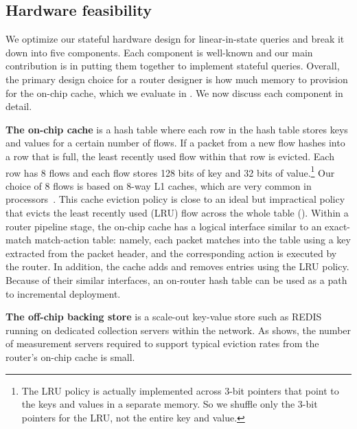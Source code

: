 
\subsection{Hardware feasibility}
\label{sec:hardware-feasibility}
We optimize our stateful hardware design for linear-in-state queries and break
it down into five components.  Each component is well-known and our main
contribution is in putting them together to implement stateful queries.
Overall, the primary design choice for a router designer is how much memory to
provision for the on-chip cache, which we evaluate in . We now
discuss each component in detail.

\textbf{The on-chip cache} is a hash table where each row in the hash table
stores keys and values for a certain number of flows. If a packet from a new
flow hashes into a row that is full, the least recently used flow within that row is
evicted. Each row has 8 flows and each flow stores 128 bits of key and 32 bits
of value.\footnote{The LRU policy is actually implemented across 3-bit pointers
that point to the keys and values in a separate memory. So we 
shuffle only the 3-bit pointers for the LRU, not the entire key and
value.} Our choice of 8 flows is based on 8-way L1 caches, which are very
common in processors~\cite{intel_opt_manual}. This cache eviction policy is
close to an ideal but impractical policy that evicts the least recently used
(LRU) flow across the whole table ().
%
Within a router pipeline stage, the on-chip cache has a logical interface
similar to an exact-match match-action table: namely, each packet matches into
the table using a key extracted from the packet header, and the corresponding
action is executed by the router.
%
In addition, the cache adds and removes entries using the LRU policy.
%
Because of their similar interfaces, an on-router hash table can be used as
a path to
incremental deployment.

\textbf{The off-chip backing store} is a scale-out key-value store such as
REDIS running on dedicated collection servers within the network. As
 shows, the number of measurement servers required to support
typical eviction rates from the router's on-chip cache is small.%

